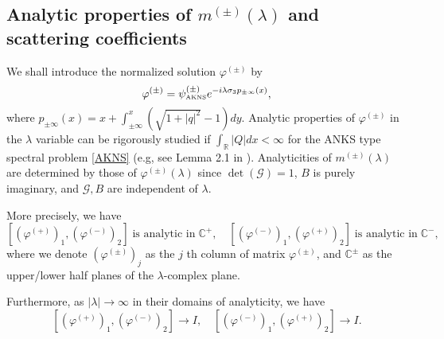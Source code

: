 \documentclass[11pt]{article}
\newcommand{\RR}{{\mathbb R}}
\newcommand{\CC}{{\mathbb C}}
\begin{document}
\subsection{Analytic properties of $m^{(\pm)}(\lambda)$ and scattering coefficients}
We shall introduce the normalized solution $\varphi^{(\pm)}$ by
$$ \varphi^{(\pm)} =  \psi_{\mbox{\tiny AKNS}}^{(\pm)} e^{-i\lambda \sigma_3p_{\pm\infty}(x)},$$ 
where
$p_{\pm\infty}(x)=x + \int_{\pm\infty}^x(\sqrt{1+|q|^2}-1)dy.$ 
Analytic properties of $\varphi^{(\pm)}$ in the $\lambda$ variable can be rigorously studied if $\int_{\RR}|Q|dx<\infty$ for the ANKS type spectral problem \eqref{AKNS} (e.g, see Lemma 2.1 in \cite{Ablowitz-Prinari-Trubatch-2004}). Analyticities of $m^{(\pm)}(\lambda)$ are determined by those of $\varphi^{(\pm)}(\lambda)$ since $\det(\mathcal{G})=1$, $B$ is purely imaginary, and $\mathcal{G}, B$ are independent of $\lambda$. 

More precisely, we have
$$[(\varphi^{(+)})_1, (\varphi^{(-)})_2] \;\mbox{is analytic in} \; \CC^+, \quad [(\varphi^{(-)})_1, (\varphi^{(+)})_2] \;\mbox{is analytic in} \; \CC^-,$$ 
where we denote $(\varphi^{(\pm)})_{j}$ as the $j$ th column of matrix $\varphi^{(\pm)}$, and $\CC^{\pm}$ as the upper/lower half planes of the $\lambda$-complex plane.

Furthermore, as $|\lambda|\rightarrow \infty$ in their domains of analyticity, we have 
\begin{equation}\label{asymptotic}
[(\varphi^{(+)})_1, (\varphi^{(-)})_2] \rightarrow I, \quad [(\varphi^{(-)})_1, (\varphi^{(+)})_2] \rightarrow I.
\end{equation} 
\end{document}

